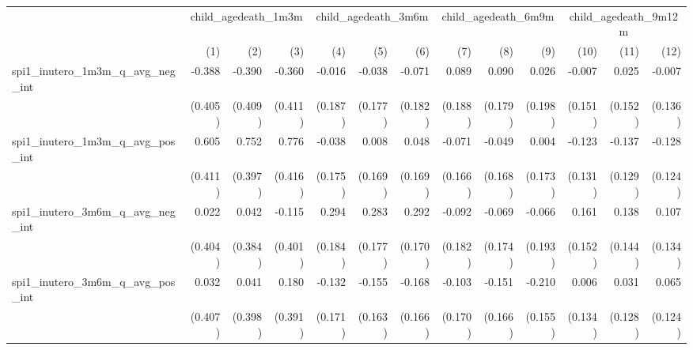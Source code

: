 \begin{tabular}{lrrrrrrrrrrrr}
\toprule
                                            &  \multicolumn{3}{c}{child\_agedeath\_1m3m} &  \multicolumn{3}{c}{child\_agedeath\_3m6m} &  \multicolumn{3}{c}{child\_agedeath\_6m9m} & \multicolumn{3}{c}{child\_agedeath\_9m12m} \\ 
\cmidrule(lr){2-4} \cmidrule(lr){5-7} \cmidrule(lr){8-10} \cmidrule(lr){11-13} 
                                            &          (1) &          (2) &          (3) &          (4) &          (5) &          (6) &          (7) &          (8) &          (9) &         (10) &         (11) &         (12) \\ 
\midrule
spi1\_inutero\_1m3m\_q\_avg\_neg\_int       &       -0.388 &       -0.390 &       -0.360 &       -0.016 &       -0.038 &       -0.071 &        0.089 &        0.090 &        0.026 &       -0.007 &        0.025 &       -0.007 \\ 
                                            &      (0.405) &      (0.409) &      (0.411) &      (0.187) &      (0.177) &      (0.182) &      (0.188) &      (0.179) &      (0.198) &      (0.151) &      (0.152) &      (0.136) \\ 
spi1\_inutero\_1m3m\_q\_avg\_pos\_int       &        0.605 &        0.752 &        0.776 &       -0.038 &        0.008 &        0.048 &       -0.071 &       -0.049 &        0.004 &       -0.123 &       -0.137 &       -0.128 \\ 
                                            &      (0.411) &      (0.397) &      (0.416) &      (0.175) &      (0.169) &      (0.169) &      (0.166) &      (0.168) &      (0.173) &      (0.131) &      (0.129) &      (0.124) \\ 
spi1\_inutero\_3m6m\_q\_avg\_neg\_int       &        0.022 &        0.042 &       -0.115 &        0.294 &        0.283 &        0.292 &       -0.092 &       -0.069 &       -0.066 &        0.161 &        0.138 &        0.107 \\ 
                                            &      (0.404) &      (0.384) &      (0.401) &      (0.184) &      (0.177) &      (0.170) &      (0.182) &      (0.174) &      (0.193) &      (0.152) &      (0.144) &      (0.134) \\ 
spi1\_inutero\_3m6m\_q\_avg\_pos\_int       &        0.032 &        0.041 &        0.180 &       -0.132 &       -0.155 &       -0.168 &       -0.103 &       -0.151 &       -0.210 &        0.006 &        0.031 &        0.065 \\ 
                                            &      (0.407) &      (0.398) &      (0.391) &      (0.171) &      (0.163) &      (0.166) &      (0.170) &      (0.166) &      (0.155) &      (0.134) &      (0.128) &      (0.124) \\ 

\end{tabular}
